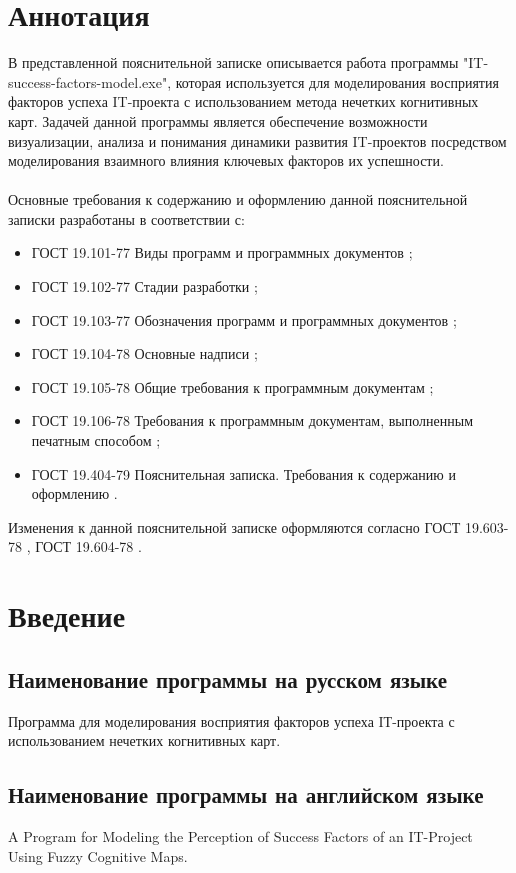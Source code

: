 \documentclass{article}
\begin{document}
    \section {Аннотация}
    В представленной пояснительной записке описывается работа программы "{}IT-success-factors-model.exe"{}, которая используется для моделирования восприятия факторов успеха IT-проекта с использованием метода нечетких когнитивных карт. Задачей данной программы является обеспечение возможности визуализации, анализа и понимания динамики развития IT-проектов посредством моделирования взаимного влияния ключевых факторов их успешности.\\
    ~\\
    Основные требования к содержанию и оформлению данной пояснительной записки разработаны в соответствии с:
    \begin{itemize}
        \item ГОСТ 19.101-77 Виды программ и программных документов \cite{litlink1};
        \item ГОСТ 19.102-77 Стадии разработки \cite{litlink2};
        \item ГОСТ 19.103-77 Обозначения программ и программных документов \cite{litlink3};
        \item ГОСТ 19.104-78 Основные надписи \cite{litlink4};
        \item ГОСТ 19.105-78 Общие требования к программным документам \cite{litlink5};
        \item ГОСТ 19.106-78 Требования к программным документам, выполненным печатным
        способом \cite{litlink6};
        \item ГОСТ 19.404-79 Пояснительная записка. Требования к содержанию и оформлению \cite{litlink7}.
    \end{itemize}
    Изменения к данной пояснительной записке оформляются согласно ГОСТ 19.603-78 \cite{litlink8}, ГОСТ 19.604-78 \cite{litlink9}.
    \newpage
    \section {Введение}
    \subsection {Наименование программы на русском языке}
    Программа для моделирования восприятия факторов успеха IТ-проекта с использованием нечетких когнитивных карт.
    \subsection {Наименование программы на английском языке}
    A Program for Modeling the Perception of Success Factors of an IT-Project Using Fuzzy Cognitive Maps.
\end{document}

